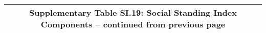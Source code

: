 \begin{longtable}{llcccccccccc}
\multicolumn{12}{c}{{\bfseries Supplementary Table SI.19: Social Standing Index Components -- continued from previous page}} \\ \hline                                                                                                                                                                                                                                                                                                                                                                                                                                                                                                                                                                                                                                                                                                                                                    

\end{longtable}
